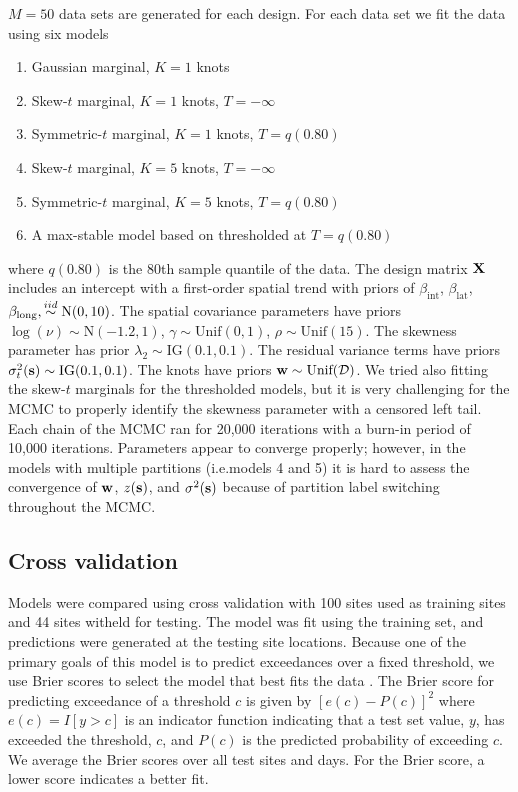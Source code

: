 \documentclass[11pt]{article}
\begin{document}
$M = 50$ data sets are generated for each design.
For each data set we fit the data using six models
\begin{enumerate} \setlength{\itemsep}{-0.5em}
  \item Gaussian marginal, $K=1$ knots
  \item Skew-$t$ marginal, $K=1$ knots, $T=-\infty$
  \item Symmetric-$t$ marginal, $K=1$ knots, $T=q(0.80)$
  \item Skew-$t$ marginal, $K=5$ knots, $T=-\infty$
  \item Symmetric-$t$ marginal, $K=5$ knots, $T=q(0.80)$
  \item A max-stable model based on \citet{Reich2012} thresholded at $T = q(0.80)$
\end{enumerate}
where $q(0.80)$ is the 80th sample quantile of the data.
The design matrix $\mbox{\bf X}$ includes an intercept with a first-order spatial trend with priors of $\beta_\text{int}$, $\beta_\text{lat}$, $\beta_\text{long},  \stackrel{iid}{\sim} \text{N}(0, 10)$.
The spatial covariance parameters have priors $\log(\nu) \sim \text{N}(-1.2, 1)$, $\gamma \sim \text{Unif}(0, 1)$, $\rho \sim \text{Unif}(15)$.
The skewness parameter has prior $\lambda_2 \sim \text{IG}(0.1, 0.1)$.
The residual variance terms have priors $\sigma^2_t(\mbox{\bf s}) \sim \text{IG}(0.1, 0.1)$.
The knots have priors $\mbox{\bf w} \sim \text{Unif}({\cal D})$.
We tried also fitting the skew-$t$ marginals for the thresholded models, but it is very challenging for the MCMC to properly identify the skewness parameter with a censored left tail.
Each chain of the MCMC ran for 20,000 iterations with a burn-in period of 10,000 iterations.
Parameters appear to converge properly; however, in the models with multiple partitions (i.e.models 4 and 5) it is hard to assess the convergence of $\mbox{\bf w}$, $z(\mbox{\bf s})$, and $\sigma^2(\mbox{\bf s})$ because of partition label switching throughout the MCMC.

\subsection{Cross validation}\label{s:modelselect}
Models were compared using cross validation with 100 sites used as training sites and 44 sites witheld for testing.
The model was fit using the training set, and predictions were generated at the testing site locations.
Because one of the primary goals of this model is to predict exceedances over a fixed threshold, we use Brier scores to select the model that best fits the data \citep{Gneiting2007}.
The Brier score for predicting exceedance of a threshold $c$ is given by $[e(c) - P(c)]^2$ where $e(c) = I[y>c]$ is an indicator function indicating that a test set value, $y$, has exceeded the threshold, $c$, and $P(c)$ is the predicted probability of exceeding $c$.
We average the Brier scores over all test sites and days.
For the Brier score, a lower score indicates a better fit.
\end{document}
